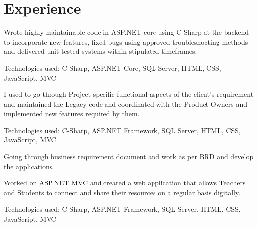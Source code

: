 \documentclass[]{deedy-resume-openfont}
\begin{document}
\hfill
\begin{minipage}[t]{0.66\textwidth} 


\section{Experience}

\vspace{\topsep}
\begin{tightemize}
\item Wrote highly maintainable code in ASP.NET core using C-Sharp at the backend to incorporate new features, fixed bugs using approved troubleshooting methods and delivered unit-tested systems within stipulated timeframes. 
\item Technologies used: C-Sharp, ASP.NET Core, SQL Server, HTML, CSS,
JavaScript, MVC
\end{tightemize}
\sectionsep

\vspace{\topsep}
\begin{tightemize}
\item I used to go through Project-specific functional aspects of the client's requirement and maintained the Legacy code and coordinated with the Product Owners and implemented new features required by
them.
\item Technologies used: C-Sharp, ASP.NET Framework, SQL Server, HTML, CSS, JavaScript, MVC
\end{tightemize}
\sectionsep

\vspace{\topsep}
\begin{tightemize}
\item Going through business requirement document and work as per BRD and develop the applications.
\item Worked on ASP.NET MVC and created a web application that allows  Teachers and Students to connect and share their resources on a regular basis digitally.
\item Technologies used: C-Sharp, ASP.NET Framework, SQL Server, HTML, CSS, JavaScript, MVC
\end{tightemize}
\sectionsep


\end{minipage}
\end{document}
